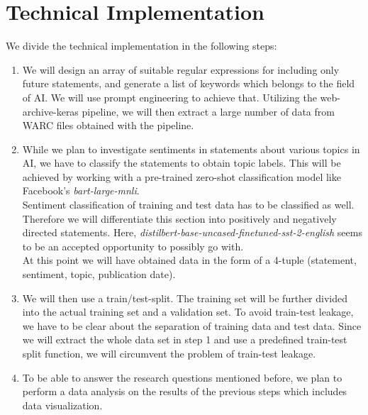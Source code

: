 \documentclass[11pt]{article}
\begin{document}
\section{Technical Implementation}
We divide the technical implementation in the following steps:

\begin{enumerate}
\item%
We will design an array of suitable regular expressions for including only future statements, and generate a list of keywords which belongs to the field of AI.
We will use prompt engineering to achieve that.
Utilizing the web-archive-keras pipeline, we will then extract a large number of data from WARC files obtained with the pipeline.

\item%
While we plan to investigate sentiments in statements about various topics in AI, we have to classify the statements to obtain topic labels.
This will be achieved by working with a pre-trained zero-shot classification model like Facebook’s \textit{bart-large-mnli}.
\\
Sentiment classification of training and test data has to be classified as well.
Therefore we will differentiate this section into positively and negatively directed statements.
Here, \textit{distilbert-base-uncased-finetuned-sst-2-english} seems to be an accepted opportunity to possibly go with.
\\
At this point we will have obtained data in the form of a 4-tuple (statement, sentiment, topic, publication date).

\item%
We will then use a train/test-split.
The training set will be further divided into the actual training set and a validation set.
To avoid train-test leakage, we have to be clear about the separation of training data and test data.
Since we will extract the whole data set in step 1 and use a predefined train-test split function, we will circumvent the problem of train-test leakage.

\item%
To be able to answer the research questions mentioned before, we plan to perform a data analysis on the results of the previous steps which includes data visualization.
\end{enumerate}
\end{document}
